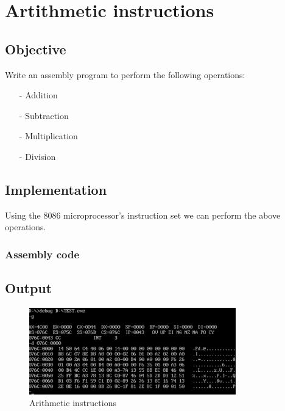 \section{Artithmetic instructions}

\subsection{Objective}

Write an assembly program to perform the following operations:

\begin{itemize}
    \item[-] Addition
    \item[-] Subtraction
    \item[-] Multiplication
    \item[-] Division
\end{itemize}

\subsection{Implementation}

Using the 8086 microprocessor's instruction set we can perform the above operations.

\subsubsection{Assembly code}


\subsection{Output}

\begin{figure}[ht]
    \centering
    \includegraphics[width=0.8\textwidth]{./res/practicals/arithmetic.png}
    \caption{Arithmetic instructions}
    \label{fig:arithmetic_instructions}
\end{figure}

